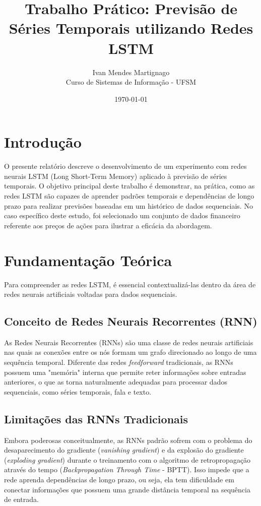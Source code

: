\documentclass[12pt,a4paper]{article}
\title{Trabalho Prático: Previsão de Séries Temporais utilizando Redes LSTM}
\author{Ivan Mendes Martignago \\ Curso de Sistemas de Informação - UFSM}
\date{\today}
\begin{document}
\maketitle

\section{Introdução}
O presente relatório descreve o desenvolvimento de um experimento com redes neurais LSTM (Long Short-Term Memory) aplicado à previsão de séries temporais. O objetivo principal deste trabalho é demonstrar, na prática, como as redes LSTM são capazes de aprender padrões temporais e dependências de longo prazo para realizar previsões baseadas em um histórico de dados sequenciais. No caso específico deste estudo, foi selecionado um conjunto de dados financeiro referente aos preços de ações para ilustrar a eficácia da abordagem.

\section{Fundamentação Teórica}
Para compreender as redes LSTM, é essencial contextualizá-las dentro da área de redes neurais artificiais voltadas para dados sequenciais.

\subsection{Conceito de Redes Neurais Recorrentes (RNN)}
As Redes Neurais Recorrentes (RNNs) são uma classe de redes neurais artificiais nas quais as conexões entre os nós formam um grafo direcionado ao longo de uma sequência temporal. Diferente das redes \textit{feedforward} tradicionais, as RNNs possuem uma "memória" interna que permite reter informações sobre entradas anteriores, o que as torna naturalmente adequadas para processar dados sequenciais, como séries temporais, fala e texto.

\subsection{Limitações das RNNs Tradicionais}
Embora poderosas conceitualmente, as RNNs padrão sofrem com o problema do desaparecimento do gradiente (\textit{vanishing gradient}) e da explosão do gradiente (\textit{exploding gradient}) durante o treinamento com o algoritmo de retropropagação através do tempo (\textit{Backpropagation Through Time} - BPTT). Isso impede que a rede aprenda dependências de longo prazo, ou seja, ela tem dificuldade em conectar informações que possuem uma grande distância temporal na sequência de entrada.
\end{document}
